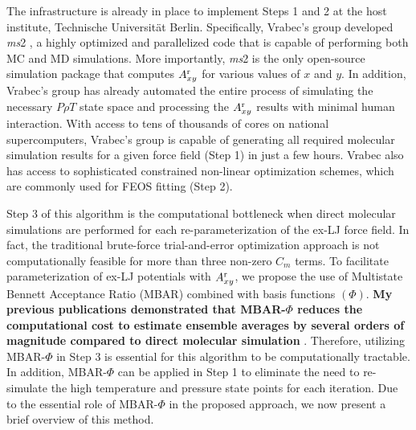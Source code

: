 \documentclass[12pt,a4paper]{article}
\begin{document}
The infrastructure is already in place to implement Steps 1 and 2 at the host institute, Technische Universit\"{a}t Berlin. Specifically, Vrabec's group developed \textit{ms}2 \cite{ms2}, a highly optimized and parallelized code that is capable of performing both MC and MD simulations. More importantly, \textit{ms}2 is the only open-source simulation package that computes $A_{xy}^{\rm r}$ for various values of $x$ and $y$. In addition, Vrabec's group has already automated the entire process of simulating the necessary $P \rho T$ state space and processing the $A_{xy}^{\rm r}$ results with minimal human interaction. With access to tens of thousands of cores on national supercomputers, Vrabec's group is capable of generating all required molecular simulation results for a given force field (Step 1) in just a few hours. Vrabec also has access to sophisticated constrained non-linear optimization schemes, which are commonly used for FEOS fitting (Step 2). 



Step 3 of this algorithm is the computational bottleneck when direct molecular simulations are performed for each re-parameterization of the ex-LJ force field. In fact, the traditional brute-force trial-and-error optimization approach is not computationally feasible for more than three non-zero $C_m$ terms. To facilitate parameterization of ex-LJ potentials with $A_{xy}^{\rm r}$, we propose the use of Multistate Bennett Acceptance Ratio (MBAR) combined with basis functions $(\Phi)$. \textbf{My previous publications demonstrated that MBAR-$\Phi$ reduces the computational cost to estimate ensemble averages by several orders of magnitude compared to direct molecular simulation} \cite{Messerly2018_1,Messerly2018_2}. Therefore, utilizing MBAR-$\Phi$ in Step 3 is essential for this algorithm to be computationally tractable. In addition, MBAR-$\Phi$ can be applied in Step 1 to eliminate the need to re-simulate the high temperature and pressure state points for each iteration. Due to the essential role of MBAR-$\Phi$ in the proposed approach, we now present a brief overview of this method. 
\end{document}

